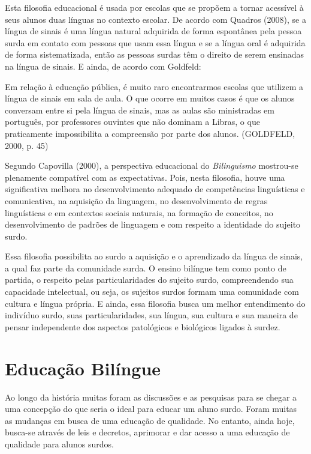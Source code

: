 \documentclass[brasil]{abnt}
\begin{document}
			Esta filosofia educacional é usada por escolas que se propõem a tornar acessível à seus alunos duas línguas no contexto escolar. De acordo com Quadros (2008), se a língua de sinais é uma língua 
			natural adquirida de forma espontânea pela pessoa surda em contato com pessoas que usam essa língua e se a língua oral é adquirida de forma sistematizada, então as pessoas surdas têm o direito de 
			serem ensinadas na língua de sinais. E ainda, de acordo com Goldfeld:
			
				\begin{citacao} Em relação à educação pública, é muito raro encontrarmos escolas que utilizem a língua de sinais em sala de aula. O que ocorre em muitos casos é que os alunos conversam entre 
								si pela língua de sinais, mas as aulas são ministradas em português, por professores ouvintes que não dominam a Libras, o que praticamente impossibilita a compreensão por parte
								dos alunos. (GOLDFELD, 2000, p. 45)
				\end{citacao}
			
			Segundo Capovilla (2000), a perspectiva educacional do \textit{Bilinguismo} mostrou-se plenamente compatível com as expectativas. Pois, nesta filosofia, houve uma significativa melhora no desenvolvimento adequado de 
			competências linguísticas e comunicativa, na aquisição da linguagem, no desenvolvimento de regras linguísticas e em contextos sociais naturais, na formação de conceitos, no desenvolvimento de 
			padrões de linguagem e com respeito a identidade do sujeito surdo.  
			
			Essa filosofia possibilita ao surdo a aquisição e o aprendizado da língua de sinais, a qual faz parte da comunidade surda. O ensino bilíngue tem como ponto de partida, o respeito pelas 
			particularidades do sujeito surdo, compreendendo sua capacidade intelectual, ou seja, os sujeitos surdos formam uma comunidade com cultura e língua própria. E ainda, essa filosofia busca um melhor 
			entendimento do indivíduo surdo, suas particularidades, sua língua, sua cultura e sua maneira de pensar independente dos aspectos patológicos e biológicos ligados à surdez.
			
\chapter{Educação Bilíngue}
	Ao longo da história muitas foram as discussões e as pesquisas para se chegar a uma concepção do que seria o ideal para educar um aluno surdo. Foram muitas as 
	mudanças em busca de uma educação de qualidade. No entanto, ainda hoje, busca-se através de leis e decretos, aprimorar e dar acesso a uma educação de qualidade para alunos surdos. 
			
\end{document}

